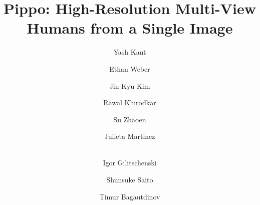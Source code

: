 \documentclass[single-column]{fairmeta_custom}
\title{Pippo: High-Resolution Multi-View Humans from a Single Image}
\author[1,2]{Yash Kant}
\author[1,3]{Ethan Weber}
\author[1]{Jin Kyu Kim}
\author[1]{Rawal Khirodkar}
\author[1]{Su Zhaoen}
\author[1]{Julieta Martinez}
\author[2\dagger]{\\ Igor Gilitschenski}
\author[1\dagger]{Shunsuke Saito}
\author[1\dagger]{Timur Bagautdinov}
\affiliation[1]{Meta Reality Labs}
\affiliation[2]{University of Toronto}
\affiliation[3]{UC Berkeley}
\begin{document}
\maketitle







\clearpage
\newpage



\clearpage
\newpage
\beginappendix

\end{document}
